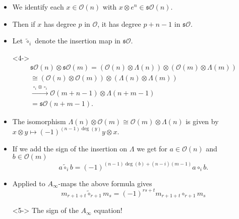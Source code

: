 \documentclass{beamer}
\theoremstyle{definition}
\begin{document}
\begin{frame}
\begin{itemize}
\item<1-> We identify each $x\in\mathcal{O}(n)$ with $x\otimes e^n\in \mathfrak{s}\mathcal{O}(n)$.
\item<2-> Then if $x$ has degree $p$ in $\mathcal{O}$, it has degree $p+n-1$ in $\mathfrak{s}\mathcal{O}$.
\item<3-> Let $\tilde{\circ}_i$ denote the insertion map in $\mathfrak{s}\mathcal{O}$.
\item[]<4-> \begin{align*}
\mathfrak{s}\mathcal{O}(n)\otimes\mathfrak{s}\mathcal{O}(m)=(\mathcal{O}(n)\otimes\Lambda(n))\otimes (\mathcal{O}(m)\otimes\Lambda(m))\\
\cong (\mathcal{O}(n)\otimes \mathcal{O}(m))\otimes (\Lambda(n)\otimes \Lambda(m))\\
\xrightarrow{\circ_i\otimes\circ_i} \mathcal{O}(m+n-1)\otimes \Lambda(n+m-1)\\=\mathfrak{s}\mathcal{O}(n+m-1).
\end{align*}
\end{itemize}
\end{frame}
\begin{frame}
\begin{itemize}
\item<1-> The isomorphism $\Lambda(n)\otimes \mathcal{O}(m)\cong \mathcal{O}(m)\otimes \Lambda(n)$ is given by $x\otimes y\mapsto (-1)^{(n-1)\deg(y)}y\otimes x$.
\item<2-> If we add the sign of the insertion on $\Lambda$ we get for $a\in\mathcal{O}(n)$ and $b\in\mathcal{O}(m)$
\[a\tilde{\circ}_ib=(-1)^{(n-1)\deg(b)+(n-i)(m-1)}a\circ_i b.\]
\item<3-> Applied to $A_\infty$-maps the above formula gives 
\[m_{r+1+t}\tilde{\circ}_{r+1}m_s=(-1)^{rs+t}m_{r+1+t}\circ_{r+1}m_s\]
\item[]<5-> The sign of the $A_\infty$ equation!
\end{itemize}
\end{frame}
\end{document}
